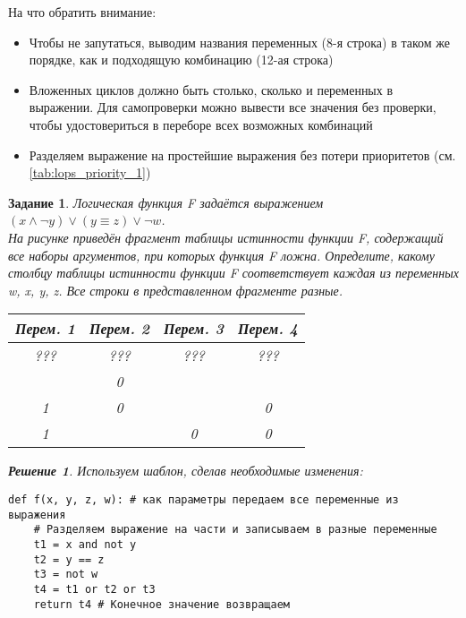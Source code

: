 \documentclass[12pt]{article}
\theoremstyle{problem_style}
\newtheorem{problem}{Задание}[subsection]
\newtheorem{solution}{Решение}[subsection]
\begin{document}
На что обратить внимание:
\begin{itemize}
    \item Чтобы не запутаться, выводим названия переменных (8-я строка) в таком же порядке, как и подходящую комбинацию (12-ая строка)
    \item Вложенных циклов должно быть столько, сколько и переменных в выражении. Для самопроверки можно вывести все значения без проверки, чтобы удостовериться в переборе всех возможных комбинаций
    \item Разделяем выражение на простейшие выражения без потери приоритетов (см. \autoref{tab:lops_priority_1})
\end{itemize}
\begin{problem}
Логическая функция F задаётся выражением \((x \land \neg y) \lor (y \equiv z) \lor \neg w\).\\ На рисунке приведён фрагмент таблицы истинности функции F, содержащий все наборы аргументов, при которых функция F ложна. Определите, какому столбцу таблицы истинности функции F соответствует каждая из переменных w, x, y, z. Все строки в представленном фрагменте разные.
\begin{table}[ht]
    \centering
    \begin{tabular}{|c|c|c|c|}
        \hline
        \textbf{Перем. 1} & \textbf{Перем. 2} & \textbf{Перем. 3} & \textbf{Перем. 4} \\
        \hline
        ??? & ??? & ??? & ??? \\
        \hline
         & 0 &  &  \\
        \hline
        1 & 0 &  & 0 \\
        \hline
        1 &  & 0 & 0 \\
        \hline
    \end{tabular}
\end{table}
\begin{solution}
Используем шаблон, сделав необходимые изменения:
\begin{verbatim}
def f(x, y, z, w): # как параметры передаем все переменные из выражения
    # Разделяем выражение на части и записываем в разные переменные
    t1 = x and not y
    t2 = y == z
    t3 = not w
    t4 = t1 or t2 or t3
    return t4 # Конечное значение возвращаем


\end{verbatim}
\end{solution}
\end{problem}
\end{document}
